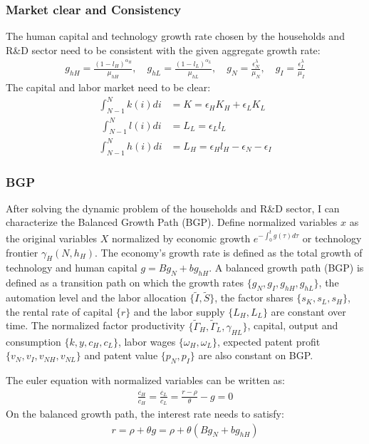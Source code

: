 \documentclass[12pt]{article}
\begin{document}
\subsubsection*{Market clear and Consistency}
The human capital and technology growth rate chosen by the households and R\&D sector need to be consistent with the given aggregate growth rate:
\begin{align*}
g_{hH} = \frac{(1-l_H)^{\alpha_H}}{\mu_{hH}}, \quad g_{hL} = \frac{(1-l_L)^{\alpha_L}}{\mu_{hL}}, \quad g_N = \frac{\epsilon_N^{\lambda}}{\mu_N}, \quad g_I = \frac{\epsilon_I^{\lambda}}{\mu_I} 
\end{align*}
The capital and labor market need to be clear: 
\begin{align*}
\int_{N-1}^N k(i) di &= K = \epsilon_H K_H + \epsilon_L K_L \\\
\int_{N-1}^N l(i) di &= L_L = \epsilon_L l_L \\
\int_{N-1}^N h(i) di &= L_H = \epsilon_H l_H-\epsilon_N-\epsilon_I
\end{align*}

\subsubsection*{BGP}
After solving the dynamic problem of the households and R\&D sector, I can characterize the Balanced Growth Path (BGP). Define normalized variables $x$ as the original variables $X$ normalized by economic growth $e^{-\int_0^{t}g(\tau)d\tau}$ or technology frontier $\gamma_H(N,h_H)$. The economy's growth rate is defined as the total growth of technology and human capital $g = Bg_N+bg_{hH}$. A balanced growth path (BGP) is defined as a transition path on which the growth rates $\{g_N, g_I, g_{hH},g_{hL}\}$, the automation level and the labor allocation $\{\tilde{I},\tilde{S}\}$, the factor shares $\{s_K,s_L, s_H\}$, the rental rate of capital $\{r\}$ and the labor supply $\{L_H, L_L\}$ are constant over time. The normalized factor productivity $\{\tilde{\Gamma}_H, \tilde{\Gamma}_L, \gamma_{HL}\}$, capital, output and consumption $\{k, y, c_H, c_L\}$, labor wages $\{\omega_H, \omega_L\}$, expected patent profit $\{v_N,v_I,v_{NH},v_{NL}\}$ and patent value $\{p_N, p_I\}$ are also constant on BGP.

The euler equation with normalized variables can be written as: 
\begin{align*}
\frac{\dot{c_H}}{c_H} = \frac{\dot{c_L}}{c_L} = \frac{r-\rho}{\theta}-g = 0 
\end{align*}
On the balanced growth path, the interest rate needs to satisfy: 
\begin{align}
\label{LRR}
r = \rho+\theta g = \rho+\theta(Bg_N+bg_{hH})
\end{align}
\end{document}
